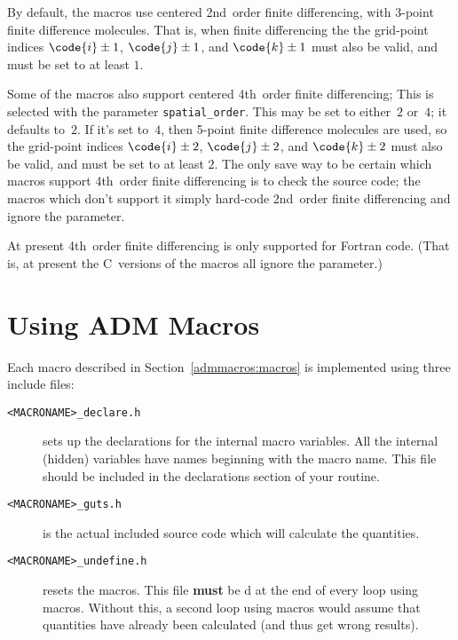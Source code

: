 By default, the macros use centered 2nd~order finite differencing,
with 3-point finite difference molecules.
That is, when finite differencing the the grid-point indices
$\code{i} \pm 1$, $\code{j} \pm 1$, and $\code{k} \pm 1$
must also be valid, and  must be set
to at least $1$.

Some of the macros also support centered 4th~order finite differencing;
This is selected with the parameter \verb|spatial_order|.  This may be
set to either~$2$ or~$4$; it defaults to~$2$.  If it's set to~$4$, then
5-point finite difference molecules are used, so the grid-point indices
$\code{i} \pm 2$, $\code{j} \pm 2$, and $\code{k} \pm 2$
must also be valid, and  must be set
to at least $2$.  The only save way to be certain which macros support
4th~order finite differencing is to check the source code; the macros
which don't support it simply hard-code 2nd~order finite differencing
and ignore the  parameter.

At present 4th~order finite differencing is only supported for Fortran
code.  (That is, at present the C~versions of the macros all ignore the
 parameter.)


\section{Using ADM Macros}

Each macro described in Section~\ref{admmacros:macros} is implemented
using three include files:
\begin{description}
\item[\texttt{<MACRONAME>\_declare.h}]
        sets up the declarations for the internal macro variables.
        All the internal (hidden) variables have names beginning
        with the macro name. This file should be included in the
        declarations section of your routine.

\item[\texttt{<MACRONAME>\_guts.h}]
	is the actual included source code which will calculate the quantities.

\item[\texttt{<MACRONAME>\_undefine.h}]
	resets the macros. This file \textbf{must} be d
	at the end of every loop using macros.  Without this, a second loop
        using macros would assume that quantities have already been calculated
	(and thus get wrong results).
\end{description}

